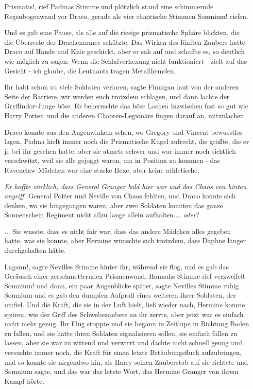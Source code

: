 \glqq Prismatis!\grqq{}, rief Padmas Stimme und plötzlich stand eine schimmernde
Regenbogenwand vor Draco, gerade als vier chaotische Stimmen \glqq
Somnium!\grqq{} riefen.

Und es gab eine Pause, als alle auf die riesige prismatische Sphäre blickten,
die die Überreste der Drachenarmee schützte. Das Wirken des fünften Zaubers
hatte Draco auf Hände und Knie geschickt, aber er sah auf und schaffte es, so
deutlich wie möglich zu sagen: \glqq Wenn die Schlafverhexung nicht funktioniert
- zielt auf das Gesicht - ich glaube, die Leutnants tragen Metallhemden.\grqq{}

\glqq Ihr habt schon zu viele Soldaten verloren\grqq{}, sagte Finnigan laut von
der anderen Seite der Barriere, \glqq wir werden euch trotzdem schlagen\grqq{},
und dann lachte der Gryffindor-Junge böse. Er beherrschte das böse Lachen
inzwischen fast so gut wie Harry Potter, und die anderen Chaoten-Legionäre
fingen darauf an, mitzulachen.

Draco konnte aus den Augenwinkeln sehen, wo Gregory und Vincent bewusstlos
lagen. Padma hielt immer noch die Prismatische Kugel aufrecht, die größte, die
er je bei ihr gesehen hatte; aber sie atmete schwer und war immer noch sichtlich
verschwitzt, weil sie alle gejoggt waren, um in Position zu kommen - das
Ravenclaw-Mädchen war eine starke Hexe, aber keine athletische.

\emph{Er hoffte wirklich, dass General Granger bald hier war und das Chaos von
hinten angriff.} General Potter und Neville von Chaos fehlten, und Draco konnte
sich denken, wo sie hingegangen waren, aber zwei Soldaten konnten das ganze
Sonnenschein Regiment nicht allzu lange allein aufhalten.... \emph{oder}?

... Sie wusste, dass es nicht fair war, dass das andere Mädchen alles gegeben
hatte, was sie konnte, aber Hermine wünschte sich trotzdem, dass Daphne länger
durchgehalten hätte.

\glqq Lagann!\grqq{}, sagte Nevilles Stimme hinter ihr, während sie flog, und es
gab das Geräusch einer zerschmetternden Prismenwand, Hannahs Stimme rief
verzweifelt \glqq Somnium!\grqq{} und dann, ein paar Augenblicke später, sagte
Nevilles Stimme ruhig \glqq Somnium\grqq{} und es gab den dumpfen Aufprall eines
weiteren ihrer Soldaten, der umfiel. Und die Kraft, die sie in der Luft hielt,
ließ wieder nach, Hermine konnte spüren, wie der Griff des Schwebezaubers an ihr
zerrte, aber jetzt war es einfach nicht mehr genug. Ihr Flug stoppte und sie
begann in Zeitlupe in Richtung Boden zu fallen, und sie hätte ihren Soldaten
signalisieren sollen, sie einfach fallen zu lassen, aber sie war zu wütend und
verwirrt und dachte nicht schnell genug und versuchte immer noch, die Kraft für
einen letzte Betäubungsfluch aufzubringen, und so konnte sie nirgendwo hin, als
Harry seinen Zauberstab auf sie richtete und \glqq Somnium\grqq{} sagte, und das
war das letzte Wort, das Hermine Granger von ihrem Kampf hörte.

